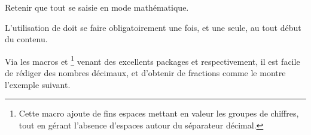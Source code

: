 \documentclass[12pt, a4paper]{article}
\begin{document}
\begin{tdocnote}
	Retenir que tout se saisie en mode mathématique.
\end{tdocnote}


\begin{tdocwarn}
	L'utilisation de  doit se faire obligatoirement une fois, et une seule, au tout début du contenu.
\end{tdocwarn}




\begin{tdocexa}
    \leavevmode

\end{tdocexa}




\begin{tdocexa}
    \leavevmode

\end{tdocexa}



\begin{tdoctip}
%
    Via les macros  et 
    \footnote{
    	Cette macro ajoute de fins espaces mettant en valeur les groupes de chiffres, tout en gérant l'absence d'espaces autour du séparateur décimal.
    }
    venant des excellents packages  et  respectivement, il est facile de rédiger des nombres décimaux, et d'obtenir de  fractions comme le montre l'exemple suivant.

\end{tdoctip}
\end{document}
